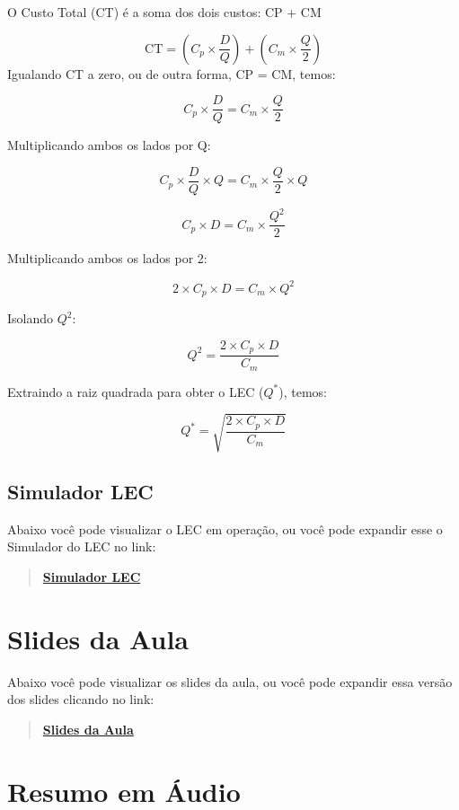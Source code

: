 \documentclass[
  a4paper,
]{book}
\begin{document}
O Custo Total (CT) é a soma dos dois custos: CP + CM

\[
\text{CT} = \left(C_p \times \frac{D}{Q}\right) + \left(C_m \times \frac{Q}{2}\right)
\] Igualando CT a zero, ou de outra forma, CP = CM, temos:

\[
C_p \times \frac{D}{Q} = C_m \times \frac{Q}{2}
\]

Multiplicando ambos os lados por Q:

\[
C_p \times \frac{D}{Q} \times Q = C_m \times \frac{Q}{2} \times Q
\]

\[
C_p \times D = C_m \times \frac{Q^2}{2}
\]

Multiplicando ambos os lados por 2:

\[
2 \times C_p \times D = C_m \times Q^2
\]

Isolando \(Q^2\):

\[
Q^2 = \frac{2 \times C_p \times D}{C_m}
\]

Extraindo a raiz quadrada para obter o LEC (\(Q^*\)), temos:

\[
Q^* = \sqrt{\frac{2 \times C_p \times D}{C_m}}
\]

\subsection{Simulador LEC}\label{simulador-lec}

Abaixo você pode visualizar o LEC em operação, ou você pode expandir
esse o Simulador do LEC no link:

\begin{quote}
\href{resources/05-lec.html}{\textbf{Simulador LEC}}
\end{quote}

\section{Slides da Aula}\label{slides-da-aula-2}

Abaixo você pode visualizar os slides da aula, ou você pode expandir
essa versão dos slides clicando no link:

\begin{quote}
\href{resources/05-estoque-ppt.html}{\textbf{Slides da Aula}}
\end{quote}

\section{Resumo em Áudio}\label{resumo-em-uxe1udio-2}
\end{document}

